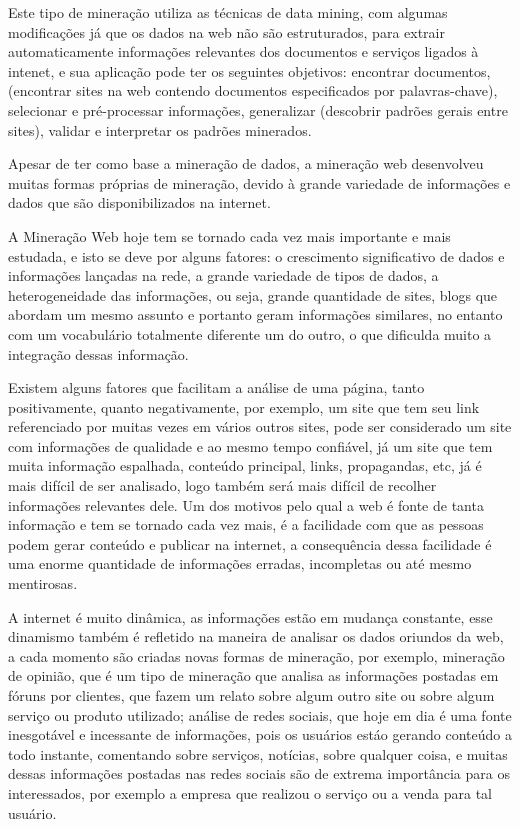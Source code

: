 	Este tipo de mineração utiliza as técnicas de data mining, com algumas modificações já que os dados na web não são estruturados, para extrair automaticamente informações relevantes dos documentos e serviços ligados à intenet, e sua aplicação pode ter os seguintes objetivos: encontrar documentos, (encontrar sites na web contendo documentos especificados por palavras-chave), selecionar e pré-processar informações, generalizar (descobrir padrões gerais entre sites), validar e interpretar os padrões minerados.

	Apesar de ter como base a mineração de dados, a mineração web desenvolveu muitas formas próprias de mineração, devido à grande variedade de informações e dados que são disponibilizados na internet.

	A Mineração Web hoje tem se tornado cada vez mais importante e mais estudada, e isto se deve por alguns fatores: o crescimento significativo de dados e informações lançadas na rede, a grande variedade de tipos de dados, a heterogeneidade das informações, ou seja, grande quantidade de sites, blogs que abordam um mesmo assunto e portanto geram informações similares, no entanto com um vocabulário totalmente diferente um do outro, o que dificulda muito a integração dessas informação.

	Existem alguns fatores que facilitam a análise de uma página, tanto positivamente, quanto negativamente, por exemplo, um site  que tem seu link referenciado por muitas vezes em vários outros sites, pode ser considerado um site com informações de qualidade e ao mesmo tempo confiável, já um site que tem muita informação espalhada, conteúdo principal, links, propagandas, etc, já é mais difícil de ser analisado, logo também será mais difícil de recolher informações relevantes dele. Um dos motivos pelo qual a web é fonte de tanta informação e tem se tornado cada vez mais, é a facilidade com que as pessoas podem gerar conteúdo e publicar na internet, a consequência dessa facilidade é uma enorme quantidade de informações erradas, incompletas ou até mesmo mentirosas.

	A internet é muito dinâmica, as informações estão em mudança constante, esse dinamismo também é refletido na maneira de analisar os dados oriundos da web, a cada momento são criadas novas formas de mineração, por exemplo, mineração de opinião, que é um tipo de mineração que analisa as informações postadas em fóruns por clientes, que fazem um relato sobre algum outro site ou sobre algum serviço ou produto utilizado; análise de redes sociais, que hoje em dia é uma fonte inesgotável e incessante de informações, pois os usuários estáo gerando conteúdo a todo instante, comentando sobre serviços, notícias, sobre qualquer coisa, e muitas dessas informações postadas nas redes sociais são de extrema importância para os interessados, por exemplo a empresa que realizou o serviço ou a venda para tal usuário.

